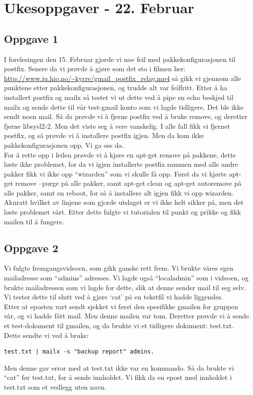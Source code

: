 \documentclass[a4paper, norsk, 12pt]{article}
\begin{document}
\section{Ukesoppgaver - 22. Februar}
\subsection{Oppgave 1}
I forelesingen den 15. Februar gjorde vi noe feil med pakkekonfigurasjonen til postfix. Senere da vi prøvde å gjøre som det sto i filmen her: \url{http://www.iu.hio.no/~kyrre/gmail_postfix_relay.mp4}
så gikk vi gjennom alle punktene etter pakkekonfigurasjonen, og trudde alt var feilfritt. Etter å ha installert postfix og mailx så testet vi ut dette ved å pipe en echo beskjed til mailx og sende dette til vår test-gmail konto som vi lagde tidligere. Det ble ikke sendt noen mail. Så da prøvde vi å fjerne postfix ved å bruke remove, og deretter fjerne libsysl2-2. Men det viste seg å vere vanskelig. I alle fall fikk vi fjernet postfix, og så prøvde vi å installere postfix igjen. Men da kom ikke pakkekonfigurasjonen opp. Vi ga oss da.\\

For å rette opp i feilen prøvde vi å kjøre en apt-get remove på pakkene, dette løste ikke problemet, for da vi igjen installerte postfix sammen med alle andre pakker fikk vi ikke opp “wizarden” som vi skulle få opp. Først da vi kjørte apt-get remove --purge på alle pakker, samt apt-get clean og apt-get autoremove på alle pakker, samt en reboot, for så å installere alt igjen fikk vi opp wizarden. Akuratt hvilket av linjene som gjorde utslaget er vi ikke helt sikker på, men det løste problemet vårt. Etter dette fulgte vi tutorialen til punkt og prikke og fikk mailen til å fungere.

\subsection{Oppgave 2}
Vi fulgte fremgangsvideoen, som gikk ganske rett frem. Vi brukte våres egen mailadresse som “admins” adresses. Vi lagde også “localadmin” som i videoen, og brukte mailadressen som vi lagde for dette, slik at denne sender mail til seg selv. Vi tester dette til slutt ved å gjøre ‘cat’ på en tekstfil vi hadde liggendes.\\

Etter at eposten vart sendt sjekket vi først den spesifikke gmailen for gruppen vår, og vi hadde fått mail. Men denne mailen var tom. Deretter prøvde vi å sende et test-dokument til gmailen, og da brukte vi et tidligere dokument: test.txt. Dette sendte vi ved å bruke:
\begin{verbatim}
test.txt | mailx -s "backup report" admins. 
\end{verbatim}
Men denne gav error med at test.txt ikke var en kommando. Så da brukte vi “cat” før test.txt, for å sende innholdet. Vi fikk da en epost med innholdet i test.txt som et vedlegg uten navn.
\end{document}
